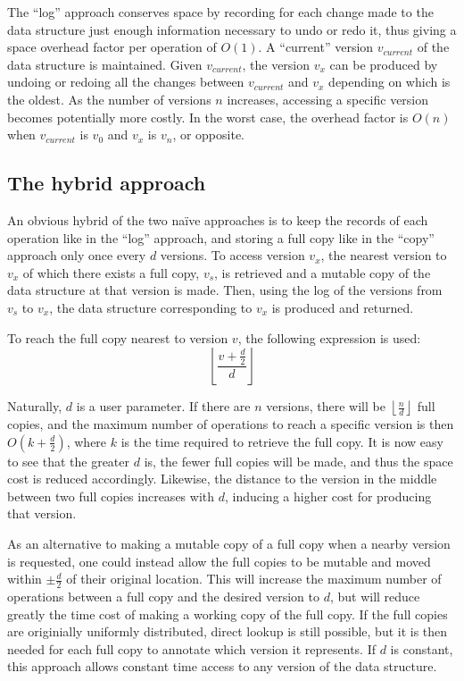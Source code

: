 The ``log'' approach conserves space by recording for each change made to the
data structure just enough information necessary to undo or redo it, thus giving
a space overhead factor per operation of $O(1)$. A ``current'' version
$v_{current}$ of the data structure is maintained. Given $v_{current}$, the
version $v_x$ can be produced by undoing or redoing all the changes between
$v_{current}$ and $v_x$ depending on which is the oldest. As the number of
versions $n$ increases, accessing a specific version becomes potentially more
costly. In the worst case, the overhead factor is $O(n)$ when $v_{current}$ is
$v_0$ and $v_x$ is $v_n$, or opposite.

\subsection{The hybrid approach}
An obvious hybrid of the two na\"ive approaches is to keep the records of each
operation like in the ``log'' approach, and storing a full copy like in the
``copy'' approach only once every $d$ versions. To access version $v_x$, the
nearest version to $v_x$ of which there exists a full copy, $v_s$, is retrieved
and a mutable copy of the data structure at that version is made. Then, using
the log of the versions from $v_s$ to $v_x$, the data structure corresponding to
$v_x$ is produced and returned.

To reach the full copy nearest to version $v$, the following expression is used:
$$
\left\lfloor \frac{v + \frac{d}{2}}{d} \right\rfloor
$$

Naturally, $d$ is a user parameter. If there are $n$ versions, there will be
$\left\lfloor \frac{n}{d} \right\rfloor$ full copies, and the maximum number of
operations to reach a specific version is then $O(k+\frac{d}{2})$, where $k$ is
the time required to retrieve the full copy. It is now easy to see that the
greater $d$ is, the fewer full copies will be made, and thus the space cost is
reduced accordingly. Likewise, the distance to the version in the middle between
two full copies increases with $d$, inducing a higher cost for producing that
version.

As an alternative to making a mutable copy of a full copy when a nearby version
is requested, one could instead allow the full copies to be mutable and moved
within $\pm\frac{d}{2}$ of their original location. This will increase the
maximum number of operations between a full copy and the desired version to $d$,
but will reduce greatly the time cost of making a working copy of the full copy.
If the full copies are originially uniformly distributed, direct lookup is still
possible, but it is then needed for each full copy to annotate which version it
represents. If $d$ is constant, this approach allows constant time access to any
version of the data structure.

